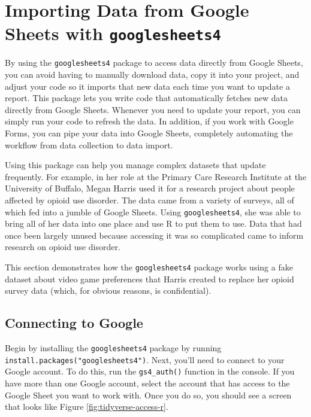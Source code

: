 \documentclass[
]{book}
\begin{document}
\hypertarget{importing-data-from-google-sheets-with-googlesheets4}{%
\section*{\texorpdfstring{Importing Data from Google Sheets with \texttt{googlesheets4}}{Importing Data from Google Sheets with googlesheets4}}\label{importing-data-from-google-sheets-with-googlesheets4}}

By using the \texttt{googlesheets4} package to access data directly from Google Sheets, you can avoid having to manually download data, copy it into your project, and adjust your code so it imports that new data each time you want to update a report. This package lets you write code that automatically fetches new data directly from Google Sheets. Whenever you need to update your report, you can simply run your code to refresh the data. In addition, if you work with Google Forms, you can pipe your data into Google Sheets, completely automating the workflow from data collection to data import.

Using this package can help you manage complex datasets that update frequently. For example, in her role at the Primary Care Research Institute at the University of Buffalo, Megan Harris used it for a research project about people affected by opioid use disorder. The data came from a variety of surveys, all of which fed into a jumble of Google Sheets. Using \texttt{googlesheets4}, she was able to bring all of her data into one place and use R to put them to use. Data that had once been largely unused because accessing it was so complicated came to inform research on opioid use disorder.

This section demonstrates how the \texttt{googlesheets4} package works using a fake dataset about video game preferences that Harris created to replace her opioid survey data (which, for obvious reasons, is confidential).

\hypertarget{connecting-to-google}{%
\subsection*{Connecting to Google}\label{connecting-to-google}}

Begin by installing the \texttt{googlesheets4} package by running \texttt{install.packages("googlesheets4")}. Next, you'll need to connect to your Google account. To do this, run the \texttt{gs4\_auth()} function in the console. If you have more than one Google account, select the account that has access to the Google Sheet you want to work with. Once you do so, you should see a screen that looks like Figure \ref{fig:tidyverse-access-r}.
\end{document}

